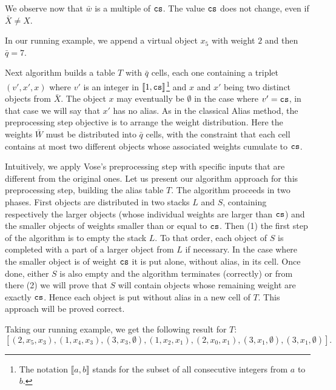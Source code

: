 \begin{remarks*}
    We observe now that $\bar{w}$ is a multiple of $\texttt{cs}$.
    The value $\texttt{cs}$ does not change, even if $\bar{X} \neq X$.
\end{remarks*}
In our running example, we append a virtual object $x_5$ with weight $2$ and then $\bar{q} = 7$.

Next algorithm builds a table $T$ with $\bar{q}$ cells,
each one containing a triplet $(v', x', x)$ where $v'$ is an integer in 
$\llbracket 1, \texttt{cs} \rrbracket$\footnote{The notation $\llbracket a, b \rrbracket$ 
    stands for the subset of all consecutive integers from $a$ to $b$.}
and $x$ and $x'$ being two distinct objects from $\bar{X}$. The object $x$ may eventually be $\emptyset$
in the case where $v'=\texttt{cs}$, in that case we will say that $x'$ has no alias.
As in the classical Alias method, 
the preprocessing step objective is to arrange the weight distribution.
Here the weights $\bar{W}$ must be distributed into $\bar{q}$ cells,
with the constraint that each cell contains at most two different objects whose associated weights cumulate to $\texttt{cs}$.

Intuitively, we apply Vose's preprocessing step with specific inputs that are different from the original ones.
Let us present our algorithm approach for this preprocessing step, building the alias table $T$.
The algorithm proceeds in two phases. 
First objects are distributed in two stacks $L$ and $S$,
containing respectively the larger objects (whose individual weights
are larger than $\texttt{cs}$)
and the smaller objects of weights smaller than or equal to $\texttt{cs}$. Then
(1) the first step of the algorithm is to empty the stack $L$.
To that order, each object of $S$ is completed with a part of a larger object from $L$
if necessary. In the case where the smaller object is of weight $\texttt{cs}$ it is put alone, without alias, in its cell.
Once done,  either $S$ is also empty and the algorithm terminates (correctly)
or from there (2) we will prove that $S$ will contain objects whose remaining weight are exactly $\texttt{cs}$. Hence each object is put
without alias in a new cell of $T$.
This approach will be proved correct. 

Taking our running example, we get the following result for $T$:
\[
    [(2, x_5, x_3), (1, x_4, x_3), (3, x_3, \emptyset), (1, x_2, x_1), (2, x_0, x_1), (3, x_1, \emptyset), (3, x_1, \emptyset) ].
\]

